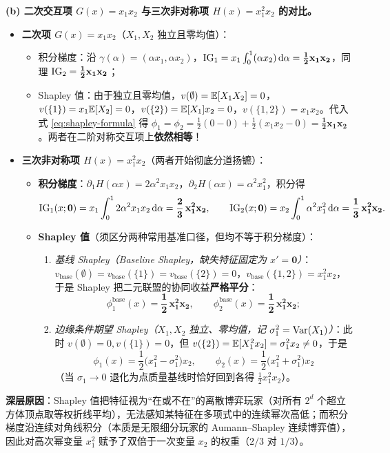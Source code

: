 \textbf{(b) 二次交互项 $G(x) = x_1 x_2$ 与三次非对称项 $H(x) = x_1^2 x_2$ 的对比。}
\begin{itemize}
  \item \textbf{二次项 $G(x) = x_1 x_2$}（$X_1, X_2$ 独立且零均值）：
  \begin{itemize}
    \item 积分梯度：沿 $\gamma(\alpha) = (\alpha x_1, \alpha x_2)$，$\operatorname{IG}_1 = x_1 \int_0^1 (\alpha x_2)\,\mathrm{d}\alpha = \mathbf{\frac{1}{2}x_1 x_2}$，同理 $\operatorname{IG}_2 = \mathbf{\frac{1}{2}x_1 x_2}$；
    \item Shapley 值：由于独立且零均值，$v(\emptyset) = \mathbb{E}[X_1 X_2] = 0$，$v(\{1\}) = x_1 \mathbb{E}[X_2] = 0$，$v(\{2\}) = \mathbb{E}[X_1] x_2 = 0$，$v(\{1,2\}) = x_1 x_2$。代入式 \eqref{eq:shapley-formula} 得 $\phi_1 = \phi_2 = \frac{1}{2}(0 - 0) + \frac{1}{2}(x_1 x_2 - 0) = \mathbf{\frac{1}{2}x_1 x_2}$。两者在二阶对称交互项上\textbf{依然相等}！
  \end{itemize}
  \item \textbf{三次非对称项 $H(x) = x_1^2 x_2$}（两者开始彻底分道扬镳）：
  \begin{itemize}
    \item \textbf{积分梯度}：$\partial_1 H(\alpha x) = 2\alpha^2 x_1 x_2$，$\partial_2 H(\alpha x) = \alpha^2 x_1^2$，积分得
    \[
      \operatorname{IG}_1(x; \mathbf{0}) = x_1 \int_0^1 2\alpha^2 x_1 x_2\,\mathrm{d}\alpha = \mathbf{\frac{2}{3}\,x_1^2 x_2}, \qquad
      \operatorname{IG}_2(x; \mathbf{0}) = x_2 \int_0^1 \alpha^2 x_1^2\,\mathrm{d}\alpha = \mathbf{\frac{1}{3}\,x_1^2 x_2}.
    \]
    \item \textbf{Shapley 值}（须区分两种常用基准口径，但均不等于积分梯度）：
    \begin{enumerate}
      \item \emph{基线 Shapley（Baseline Shapley，缺失特征固定为 $x' = \mathbf{0}$）}：$v_{\text{base}}(\emptyset) = v_{\text{base}}(\{1\}) = v_{\text{base}}(\{2\}) = 0$，$v_{\text{base}}(\{1,2\}) = x_1^2 x_2$，于是 Shapley 把二元联盟的协同收益\textbf{严格平分}：
      \[
        \phi_1^{\text{base}}(x) = \mathbf{\frac{1}{2}\,x_1^2 x_2}, \qquad
        \phi_2^{\text{base}}(x) = \mathbf{\frac{1}{2}\,x_1^2 x_2};
      \]
      \item \emph{边缘条件期望 Shapley（$X_1, X_2$ 独立、零均值，记 $\sigma_1^2 = \operatorname{Var}(X_1)$）}：此时 $v(\emptyset)=0, v(\{1\})=0$，但 $v(\{2\}) = \mathbb{E}[X_1^2 x_2] = \sigma_1^2 x_2 \neq 0$，于是
      \[
        \phi_1(x) = \frac{1}{2}\big(x_1^2 - \sigma_1^2\big)x_2, \qquad
        \phi_2(x) = \frac{1}{2}\big(x_1^2 + \sigma_1^2\big)x_2
      \]
      （当 $\sigma_1 \to 0$ 退化为点质量基线时恰好回到各得 $\frac{1}{2}x_1^2 x_2$）。
    \end{enumerate}
  \end{itemize}
\end{itemize}
\textbf{深层原因}：Shapley 值把特征视为“在或不在”的离散博弈玩家（对所有 $2^d$ 个超立方体顶点取等权折线平均），无法感知某特征在多项式中的连续幂次高低；而积分梯度沿连续对角线积分（本质是无限细分玩家的 Aumann--Shapley 连续博弈值），因此对高次幂变量 $x_1^2$ 赋予了双倍于一次变量 $x_2$ 的权重（$2/3$ 对 $1/3$）。

